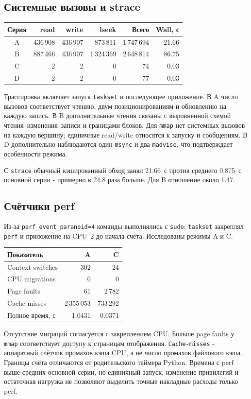 \subsection{Системные вызовы и strace}
\begin{center}
\small
\begin{tabular}{|c|r|r|r|r|r|}
\hline
Серия & read & write & lseek & Всего & Wall, с\\ \hline
A & 436\,908 & 436\,907 & 873\,811 & 1\,747\,694 & 21.66\\ \hline
B & 887\,466 & 436\,907 & 1\,324\,369 & 2\,648\,814 & 86.75\\ \hline
C & 2 & 2 & 0 & 74 & 0.03\\ \hline
D & 2 & 2 & 0 & 77 & 0.03\\ \hline
\end{tabular}
\end{center}
Трассировка включает запуск \texttt{taskset} и последующее приложение.
В A число вызовов соответствует чтению, двум позиционированиям
и обновлению на каждую запись. В B дополнительные чтения связаны
с выровненной схемой чтения--изменения--записи и границами блоков.
Для \texttt{mmap} нет системных вызовов на каждую вершину;
единичные read/write относятся к запуску и сообщениям.
В D дополнительно наблюдаются один \texttt{msync} и два
\texttt{madvise}, что подтверждает особенности режима.

С \texttt{strace} обычный кэшированный обход занял 21.66~с
против среднего 0.875~с основной серии - примерно в 24.8 раза
больше. Для B отношение около 1.47.

\subsection{Счётчики perf}
Из-за \texttt{perf\_event\_paranoid=4} команды выполнялись с
\texttt{sudo}; \texttt{taskset} закреплял \texttt{perf} и приложение
на CPU~2 до начала счёта. Исследованы режимы A и C.
\begin{center}
\small
\begin{tabular}{|l|r|r|}
\hline
Показатель & A & C\\ \hline
Context switches & 302 & 24\\ \hline
CPU migrations & 0 & 0\\ \hline
Page faults & 61 & 2\,782\\ \hline
Cache misses & 2\,355\,053 & 733\,292\\ \hline
Полное время, с & 1.0431 & 0.0371\\ \hline
\end{tabular}
\end{center}
Отсутствие миграций согласуется с закреплением CPU.
Больше page faults у \texttt{mmap} соответствует доступу к
страницам отображения. \texttt{Cache-misses} - аппаратный
счётчик промахов кэша CPU, а не число промахов файлового кэша.
Границы счёта отличаются от родительского таймера Python.
Времена с perf выше средних основной серии, но единичный запуск,
изменение привилегий и остаточная нагрузка не позволяют выделить
точные накладные расходы только perf.

